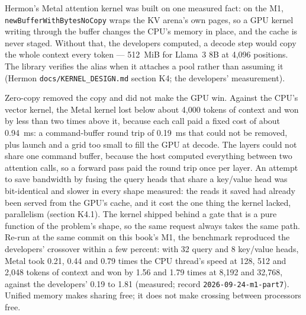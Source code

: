 


Hermon's Metal attention kernel was built on one measured fact: on the M1,
\texttt{newBufferWithBytesNoCopy} wraps the KV arena's own pages, so a GPU
kernel writing through the buffer changes the CPU's memory in place, and the
cache is never staged. Without that, the developers computed, a decode step
would copy the whole context every token --- 512~MiB for Llama~3 8B at 4,096
positions. The library verifies the alias when it attaches a pool rather than
assuming it (Hermon \texttt{docs/KERNEL\_DESIGN.md} section K4; the developers'
measurement).

Zero-copy removed the copy and did not make the GPU win. Against the CPU's
vector kernel, the Metal kernel lost below about 4,000 tokens of context and
won by less than two times above it, because each call paid a fixed cost of
about 0.94~ms: a command-buffer round trip of 0.19~ms that could not be
removed, plus launch and a grid too small to fill the GPU at decode. The layers
could not share one command buffer, because the host computed everything
between two attention calls, so a forward pass paid the round trip once per
layer. An attempt to save bandwidth by fusing the query heads that share a
key/value head was bit-identical and slower in every shape measured: the reads
it saved had already been served from the GPU's cache, and it cost the one
thing the kernel lacked, parallelism (section K4.1). The kernel shipped behind a
gate that is a pure function of the problem's shape, so the same request always
takes the same path. Re-run at the same commit on this book's M1, the benchmark
reproduced the developers' crossover within a few percent: with 32 query and 8
key/value heads, Metal took 0.21, 0.44 and 0.79 times the CPU thread's speed at
128, 512 and 2,048 tokens of context and won by 1.56 and 1.79 times at 8,192 and
32,768, against the developers' 0.19 to 1.81 (measured; record
\texttt{2026-09-24-m1-part7}). Unified memory makes sharing free; it does not
make crossing between processors free.

